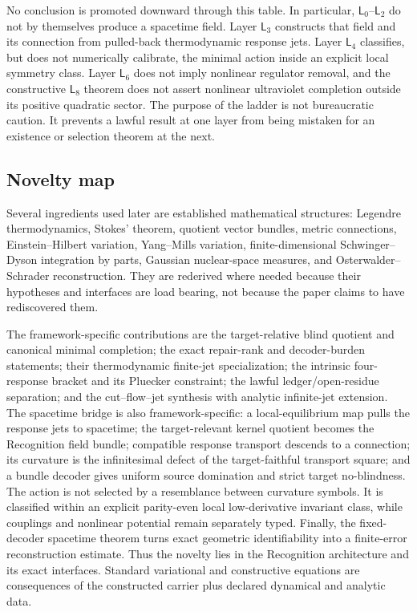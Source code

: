 No conclusion is promoted downward through this table.  In particular, $\mathsf L_0$--$\mathsf L_2$ do not by themselves produce a spacetime field.  Layer $\mathsf L_3$ constructs that field and its connection from pulled-back thermodynamic response jets.  Layer $\mathsf L_4$ classifies, but does not numerically calibrate, the minimal action inside an explicit local symmetry class.  Layer $\mathsf L_6$ does not imply nonlinear regulator removal, and the constructive $\mathsf L_8$ theorem does not assert nonlinear ultraviolet completion outside its positive quadratic sector.  The purpose of the ladder is not bureaucratic caution.  It prevents a lawful result at one layer from being mistaken for an existence or selection theorem at the next.

\subsection{Novelty map}

Several ingredients used later are established mathematical structures: Legendre thermodynamics, Stokes' theorem, quotient vector bundles, metric connections, Einstein--Hilbert variation, Yang--Mills variation, finite-dimensional Schwinger--Dyson integration by parts, Gaussian nuclear-space measures, and Osterwalder--Schrader reconstruction.  They are rederived where needed because their hypotheses and interfaces are load bearing, not because the paper claims to have rediscovered them.

The framework-specific contributions are the target-relative blind quotient and canonical minimal completion; the exact repair-rank and decoder-burden statements; their thermodynamic finite-jet specialization; the intrinsic four-response bracket and its Pluecker constraint; the lawful ledger/open-residue separation; and the cut--flow--jet synthesis with analytic infinite-jet extension.  The spacetime bridge is also framework-specific: a local-equilibrium map pulls the response jets to spacetime; the target-relevant kernel quotient becomes the Recognition field bundle; compatible response transport descends to a connection; its curvature is the infinitesimal defect of the target-faithful transport square; and a bundle decoder gives uniform source domination and strict target no-blindness.  The action is not selected by a resemblance between curvature symbols.  It is classified within an explicit parity-even local low-derivative invariant class, while couplings and nonlinear potential remain separately typed.  Finally, the fixed-decoder spacetime theorem turns exact geometric identifiability into a finite-error reconstruction estimate.  Thus the novelty lies in the Recognition architecture and its exact interfaces.  Standard variational and constructive equations are consequences of the constructed carrier plus declared dynamical and analytic data.

